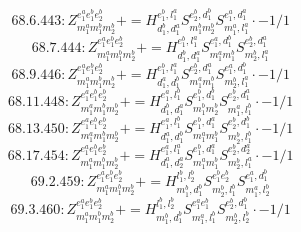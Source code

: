 \documentclass[letterpaper,10pt,fleqn,leqno,onecolumn]{article}
\begin{document}
\begin{equation} \;\;\;\;\;\;  68.6.443: Z^{e_{1}^{a}e_{1}^{b}e_{2}^{b}}_{m_{1}^{a}m_{1}^{b}m_{2}^{b}}+=H^{e_{1}^{b},l_{1}^{a}}_{d_{1}^{b},d_{1}^{a}}S^{e_{2}^{b},d_{1}^{b}}_{m_{1}^{b}m_{2}^{b}}S^{e_{1}^{a},d_{1}^{a}}_{m_{1}^{a},l_{1}^{a}}\cdot -1/1 \end{equation}
\begin{equation} \;\;\;\;\;\;  68.7.444: Z^{e_{1}^{a}e_{1}^{b}e_{2}^{b}}_{m_{1}^{a}m_{1}^{b}m_{2}^{b}}+=H^{e_{1}^{b},l_{1}^{a}}_{d_{1}^{b},d_{1}^{a}}S^{e_{1}^{a},d_{1}^{b}}_{m_{1}^{a}m_{1}^{b}}S^{e_{2}^{b},d_{1}^{a}}_{m_{2}^{b},l_{1}^{a}} \end{equation}
\begin{equation} \;\;\;\;\;\;  68.9.446: Z^{e_{1}^{a}e_{1}^{b}e_{2}^{b}}_{m_{1}^{a}m_{1}^{b}m_{2}^{b}}+=H^{e_{1}^{b},l_{1}^{a}}_{d_{1}^{a},d_{1}^{b}}S^{e_{2}^{b},d_{1}^{a}}_{m_{1}^{a}m_{1}^{b}}S^{e_{1}^{a},d_{1}^{b}}_{m_{2}^{b},l_{1}^{a}}\cdot -1/1 \end{equation}
\begin{equation} \;\;\;\;\;\;  68.11.448: Z^{e_{1}^{a}e_{1}^{b}e_{2}^{b}}_{m_{1}^{a}m_{1}^{b}m_{2}^{b}}+=H^{e_{1}^{a},l_{1}^{b}}_{d_{1}^{b},d_{1}^{a}}S^{e_{1}^{b},d_{1}^{b}}_{m_{1}^{b}m_{2}^{b}}S^{e_{2}^{b},d_{1}^{a}}_{m_{1}^{a},l_{1}^{b}}\cdot -1/1 \end{equation}
\begin{equation} \;\;\;\;\;\;  68.13.450: Z^{e_{1}^{a}e_{1}^{b}e_{2}^{b}}_{m_{1}^{a}m_{1}^{b}m_{2}^{b}}+=H^{e_{1}^{a},l_{1}^{b}}_{d_{1}^{a},d_{1}^{b}}S^{e_{1}^{b},d_{1}^{a}}_{m_{1}^{a}m_{1}^{b}}S^{e_{2}^{b},d_{1}^{b}}_{m_{2}^{b},l_{1}^{b}}\cdot -1/1 \end{equation}
\begin{equation} \;\;\;\;\;\;  68.17.454: Z^{e_{1}^{a}e_{1}^{b}e_{2}^{b}}_{m_{1}^{a}m_{1}^{b}m_{2}^{b}}+=H^{e_{1}^{a},l_{1}^{a}}_{d_{1}^{a},d_{2}^{a}}S^{e_{1}^{b},d_{1}^{a}}_{m_{1}^{a}m_{1}^{b}}S^{e_{2}^{b},d_{2}^{a}}_{m_{2}^{b},l_{1}^{a}}\cdot -1/1 \end{equation}
\begin{equation} \;\;\;\;\;\;  69.2.459: Z^{e_{1}^{a}e_{1}^{b}e_{2}^{b}}_{m_{1}^{a}m_{1}^{b}m_{2}^{b}}+=H^{l_{1}^{b},l_{2}^{b}}_{m_{1}^{b},d_{1}^{b}}S^{e_{1}^{b}e_{2}^{b}}_{m_{2}^{b},l_{1}^{b}}S^{e_{1}^{a},d_{1}^{b}}_{m_{1}^{a},l_{2}^{b}} \end{equation}
\begin{equation} \;\;\;\;\;\;  69.3.460: Z^{e_{1}^{a}e_{1}^{b}e_{2}^{b}}_{m_{1}^{a}m_{1}^{b}m_{2}^{b}}+=H^{l_{1}^{b},l_{2}^{b}}_{m_{1}^{b},d_{1}^{b}}S^{e_{1}^{a}e_{1}^{b}}_{m_{1}^{a},l_{1}^{b}}S^{e_{2}^{b},d_{1}^{b}}_{m_{2}^{b},l_{2}^{b}}\cdot -1/1 \end{equation}
\end{document}
